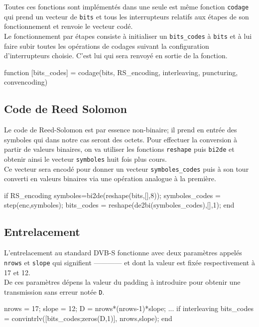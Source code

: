 \documentclass[a4paper,11pt]{article}
\begin{document}
Toutes ces fonctions sont implémentés dans une seule est même fonction \texttt{codage} qui prend un vecteur de \texttt{bits} et tous les interrupteurs relatifs aux étapes de son fonctionnement et renvoie le vecteur codé. \\
Le fonctionnement par étapes consiste à initialiser un \texttt{bits\_codes}
à \texttt{bits} et à lui faire subir toutes les opérations de codages suivant la configuration d'interrupteurs choisie. C'est lui qui sera renvoyé en sortie de la fonction.

\begin{lstun}
function [bits_codes] = codage(bits, RS_encoding, interleaving, puncturing, convencoding)
\end{lstun}
\subsection{Code de Reed Solomon}
Le code de Reed-Solomon est par essence non-binaire; il prend en entrée des symboles qui dans notre cas seront des octets. Pour effectuer la conversion à partir de valeurs binaires, on va utiliser les fonctions \texttt{reshape} puis \texttt{bi2de} et obtenir ainsi le vecteur \texttt{symboles} huit fois plus cours. \\
Ce vecteur sera encodé pour donner un vecteur \texttt{symboles\_codes} puis à son tour converti en valeurs binaires via une opération analogue à la première.

\begin{lstun}
	if RS_encoding
		symboles=bi2de(reshape(bits,[],8));
		symboles_codes = step(enc,symboles);
		bits_codes = reshape(de2bi(symboles_codes),[],1);
	end
\end{lstun}

\subsection{Entrelacement}
L'entrelacement au standard DVB-S fonctionne avec deux paramètres appelés \texttt{nrows} et \texttt{slope} qui signifient ------------ et dont la valeur est fixée respectivement à 17 et 12. \\ De ces paramètres dépens la valeur du padding à introduire pour obtenir une transmission sans erreur notée \texttt{D}.

\begin{lstun}
	nrows = 17; slope = 12;
	D = nrows*(nrows-1)*slope;
	...
	if interleaving
	bits_codes = convintrlv([bits_codes;zeros(D,1)], nrows,slope);
	end
\end{lstun}
\end{document}
